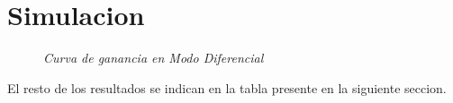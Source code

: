 \documentclass[a4paper,12pt]{article}
\begin{document}
\newpage
\section{Simulacion}
    \begin{figure}[H]
        \setlength{\abovecaptionskip}{0pt}
		\centering
		\captionsetup{labelformat=empty}
		\caption{\small{\textit{ Curva de ganancia en Modo Diferencial }}}
    \end{figure}
    El resto de los resultados se indican en la tabla presente en la siguiente seccion.


\newpage
\end{document}
